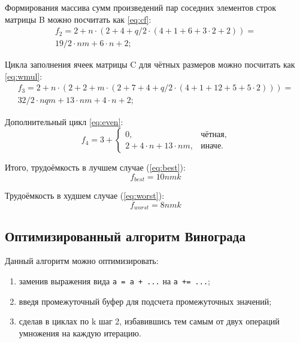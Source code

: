 Формирования массива сумм произведений пар соседних элементов строк матрицы B можно посчитать как \ref{eq:cf}:
\begin{equation}
    \label{eq:cf}
	\begin{array}{c}
	f_2 = 2 + n  \cdot(2 + 4 + q/2  \cdot (4 + 1 + 6 + 3  \cdot 2 + 2)) =  \\
		19/2 \cdot nm + 6 \cdot n + 2 ;
	\end{array}
\end{equation}

Цикла заполнения ячеек матрицы C для чётных размеров можно посчитать как \ref{eq:wmul}:
\begin{equation}
    \label{eq:wmul}
	\begin{array}{c}
	f_3 = 2 + n \cdot (2 + 2 + m \cdot (2 + 7 + 4 + q/2 \cdot (4 + 1 + 12 + 5 + 5 \cdot 2))) = \\
		32/2 \cdot nqm + 13 \cdot nm + 4 \cdot n + 2 ;
	\end{array}
\end{equation}

Дополнительный цикл \ref{eq:even}:
\begin{equation}
	\label{eq:even}
	f_4 =  3 + \begin{cases}
	0, & \text{чётная,}\\
	2 +4 \cdot n + 13 \cdot nm, & \text{иначе.}
	\end{cases}
\end{equation}

Итого, трудоёмкость в лучшем случае (\ref{eq:best}):
\begin{equation}
    \label{eq:best}
    f_{best} = 10nmk
\end{equation}

Трудоёмкость в худшем случае (\ref{eq:worst}):
\begin{equation}
    \label{eq:worst}
    f_{worst} = 8nmk
\end{equation}

\subsection{Оптимизированный алгоритм Винограда}

Данный алгоритм можно оптимизировать:
\begin{enumerate}
	\item заменив выражения вида \texttt{a = a + ...} на \texttt{a += ...};
	\item введя промежуточный буфер для подсчета промежуточных значений;
	\item сделав в циклах по k шаг 2, избавившись тем самым от двух операций умножения на каждую итерацию.
\end{enumerate}

